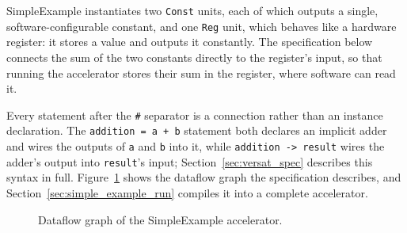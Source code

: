 %

SimpleExample instantiates two \texttt{Const} units, each of which outputs a single, software-configurable constant, and one \texttt{Reg} unit, which behaves like a hardware register: it stores a value and outputs it constantly. The specification below connects the sum of the two constants directly to the register's input, so that running the accelerator stores their sum in the register, where software can read it.

Every statement after the \texttt{\#} separator is a connection rather than an instance declaration. The \texttt{addition = a + b} statement both declares an implicit adder and wires the outputs of \texttt{a} and \texttt{b} into it, while \texttt{addition -> result} wires the adder's output into \texttt{result}'s input; Section~\ref{sec:versat_spec} describes this syntax in full. Figure~\ref{fig:simple_example_graph} shows the dataflow graph the specification describes, and Section~\ref{sec:simple_example_run} compiles it into a complete accelerator.



\begin{figure}[H]
\centering
{}
\caption{Dataflow graph of the SimpleExample accelerator.}
\label{fig:simple_example_graph}
\end{figure}
